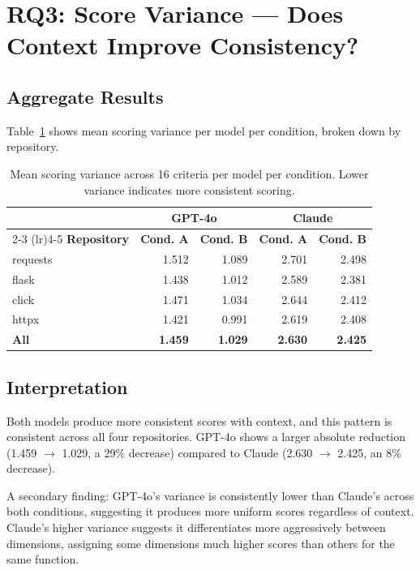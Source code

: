 \documentclass[12pt]{report}
\begin{document}
\section{RQ3: Score Variance --- Does Context Improve Consistency?}

\subsection{Aggregate Results}

Table~\ref{tab:variance_full} shows mean scoring variance per model per condition, broken down by repository.

\begin{table}[htbp]
\centering
\begin{tabular}{lrrrr}
\toprule
& \multicolumn{2}{c}{\textbf{GPT-4o}} & \multicolumn{2}{c}{\textbf{Claude}} \\
\cmidrule(lr){2-3} \cmidrule(lr){4-5}
\textbf{Repository} & \textbf{Cond. A} & \textbf{Cond. B} & \textbf{Cond. A} & \textbf{Cond. B} \\
\midrule
requests & 1.512 & 1.089 & 2.701 & 2.498 \\
flask    & 1.438 & 1.012 & 2.589 & 2.381 \\
click    & 1.471 & 1.034 & 2.644 & 2.412 \\
httpx    & 1.421 & 0.991 & 2.619 & 2.408 \\
\midrule
\textbf{All} & \textbf{1.459} & \textbf{1.029} & \textbf{2.630} & \textbf{2.425} \\
\bottomrule
\end{tabular}
\caption{Mean scoring variance across 16 criteria per model per condition. Lower variance indicates more consistent scoring.}
\label{tab:variance_full}
\end{table}

\subsection{Interpretation}

Both models produce more consistent scores with context, and this pattern is consistent across all four repositories. GPT-4o shows a larger absolute reduction (1.459 $\to$ 1.029, a 29\% decrease) compared to Claude (2.630 $\to$ 2.425, an 8\% decrease).

A secondary finding: GPT-4o's variance is consistently lower than Claude's across both conditions, suggesting it produces more uniform scores regardless of context. Claude's higher variance suggests it differentiates more aggressively between dimensions, assigning some dimensions much higher scores than others for the same function.
\end{document}
